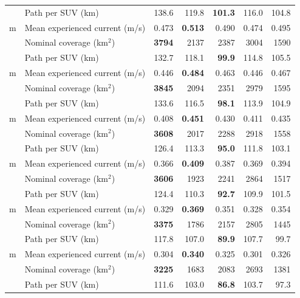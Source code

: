 \begin{center}
\begin{tabular*}{\textwidth}{@{\extracolsep{\fill}}llrrrrr@{}}
 & Path per SUV (km) & 138.6 & 119.8 & \textbf{101.3} & 116.0 & 104.8 \\
\addlinespace[1.5pt]
10 m & Mean experienced current (m/s) & 0.473 & \textbf{0.513} & 0.490 & 0.474 & 0.495 \\
 & Nominal coverage (km$^2$) & \textbf{3794} & 2137 & 2387 & 3004 & 1590 \\
 & Path per SUV (km) & 132.7 & 118.1 & \textbf{99.9} & 114.8 & 105.5 \\
\addlinespace[1.5pt]
20 m & Mean experienced current (m/s) & 0.446 & \textbf{0.484} & 0.463 & 0.446 & 0.467 \\
 & Nominal coverage (km$^2$) & \textbf{3845} & 2094 & 2351 & 2979 & 1595 \\
 & Path per SUV (km) & 133.6 & 116.5 & \textbf{98.1} & 113.9 & 104.9 \\
\addlinespace[1.5pt]
30 m & Mean experienced current (m/s) & 0.408 & \textbf{0.451} & 0.430 & 0.411 & 0.435 \\
 & Nominal coverage (km$^2$) & \textbf{3608} & 2017 & 2288 & 2918 & 1558 \\
 & Path per SUV (km) & 126.4 & 113.3 & \textbf{95.0} & 111.8 & 103.1 \\
\addlinespace[1.5pt]
40 m & Mean experienced current (m/s) & 0.366 & \textbf{0.409} & 0.387 & 0.369 & 0.394 \\
 & Nominal coverage (km$^2$) & \textbf{3606} & 1923 & 2241 & 2864 & 1517 \\
 & Path per SUV (km) & 124.4 & 110.3 & \textbf{92.7} & 109.9 & 101.5 \\
\addlinespace[1.5pt]
50 m & Mean experienced current (m/s) & 0.329 & \textbf{0.369} & 0.351 & 0.328 & 0.354 \\
 & Nominal coverage (km$^2$) & \textbf{3375} & 1786 & 2157 & 2805 & 1445 \\
 & Path per SUV (km) & 117.8 & 107.0 & \textbf{89.9} & 107.7 & 99.7 \\
\addlinespace[1.5pt]
60 m & Mean experienced current (m/s) & 0.304 & \textbf{0.340} & 0.325 & 0.301 & 0.326 \\
 & Nominal coverage (km$^2$) & \textbf{3225} & 1683 & 2083 & 2693 & 1381 \\
 & Path per SUV (km) & 111.6 & 103.0 & \textbf{86.8} & 103.7 & 97.3 \\
\bottomrule
\end{tabular*}
\end{center}
